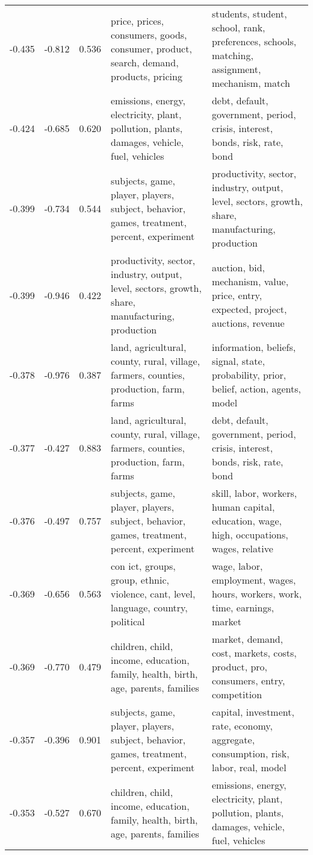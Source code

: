 \begin{tabular}{cccp{5cm}p{5cm}}
-0.435 & -0.812 & 0.536 & price, prices, consumers, goods, consumer, product, search, demand, products, pricing & students, student, school, rank, preferences, schools, matching, assignment, mechanism, match \\
-0.424 & -0.685 & 0.620 & emissions, energy, electricity, plant, pollution, plants, damages, vehicle, fuel, vehicles & debt, default, government, period, crisis, interest, bonds, risk, rate, bond \\
-0.399 & -0.734 & 0.544 & subjects, game, player, players, subject, behavior, games, treatment, percent, experiment & productivity, sector, industry, output, level, sectors, growth, share, manufacturing, production \\
-0.399 & -0.946 & 0.422 & productivity, sector, industry, output, level, sectors, growth, share, manufacturing, production & auction, bid, mechanism, value, price, entry, expected, project, auctions, revenue \\
-0.378 & -0.976 & 0.387 & land, agricultural, county, rural, village, farmers, counties, production, farm, farms & information, beliefs, signal, state, probability, prior, belief, action, agents, model \\
-0.377 & -0.427 & 0.883 & land, agricultural, county, rural, village, farmers, counties, production, farm, farms & debt, default, government, period, crisis, interest, bonds, risk, rate, bond \\
-0.376 & -0.497 & 0.757 & subjects, game, player, players, subject, behavior, games, treatment, percent, experiment & skill, labor, workers, human capital, education, wage, high, occupations, wages, relative \\
-0.369 & -0.656 & 0.563 & con ict, groups, group, ethnic, violence, cant, level, language, country, political & wage, labor, employment, wages, hours, workers, work, time, earnings, market \\
-0.369 & -0.770 & 0.479 & children, child, income, education, family, health, birth, age, parents, families & market, demand, cost, markets, costs, product, pro, consumers, entry, competition \\
-0.357 & -0.396 & 0.901 & subjects, game, player, players, subject, behavior, games, treatment, percent, experiment & capital, investment, rate, economy, aggregate, consumption, risk, labor, real, model \\
-0.353 & -0.527 & 0.670 & children, child, income, education, family, health, birth, age, parents, families & emissions, energy, electricity, plant, pollution, plants, damages, vehicle, fuel, vehicles \\

\end{tabular}
